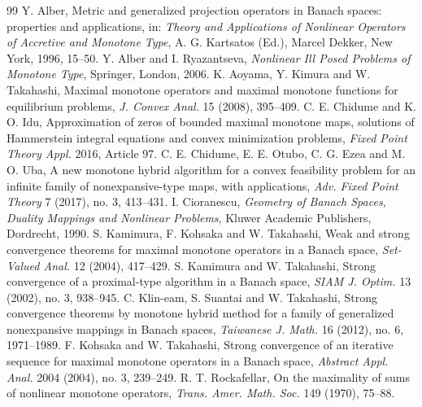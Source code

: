 \documentclass[10pt,a4paper]{amsart}
\numberwithin{equation}{section}
\begin{document}
\begin{thebibliography}{99}
 Y. Alber, Metric and generalized projection operators in Banach spaces: properties and applications, in: \emph{Theory and Applications of Nonlinear Operators of Accretive and Monotone Type}, A. G. Kartsatos (Ed.), Marcel Dekker, New York, 1996, 15--50.
 Y. Alber and I. Ryazantseva, \emph{Nonlinear Ill Posed Problems of Monotone Type}, Springer, London, 2006.
 K. Aoyama, Y. Kimura and W. Takahashi, Maximal monotone operators and maximal monotone functions for equilibrium problems, \emph{J. Convex Anal.} 15 (2008), 395--409.
 C. E. Chidume and K. O. Idu, Approximation of zeros of bounded maximal monotone maps, solutions of Hammerstein integral equations and convex minimization problems, \emph{Fixed Point Theory Appl.} 2016, Article 97.
 C. E. Chidume, E. E. Otubo, C. G. Ezea and M. O. Uba, A new monotone hybrid algorithm for a convex feasibility problem for an infinite family of nonexpansive-type maps, with applications, \emph{Adv. Fixed Point Theory} 7 (2017), no. 3, 413--431.
 I. Cioranescu, \emph{Geometry of Banach Spaces, Duality Mappings and Nonlinear Problems}, Kluwer Academic Publishers, Dordrecht, 1990.
 S. Kamimura, F. Kohsaka and W. Takahashi, Weak and strong convergence theorems for maximal monotone operators in a Banach space, \emph{Set-Valued Anal.} 12 (2004), 417--429.
 S. Kamimura and W. Takahashi, Strong convergence of a proximal-type algorithm in a Banach space, \emph{SIAM J. Optim.} 13 (2002), no. 3, 938--945.
 C. Klin-eam, S. Suantai and W. Takahashi, Strong convergence theorems by monotone hybrid method for a family of generalized nonexpansive mappings in Banach spaces, \emph{Taiwanese J. Math.} 16 (2012), no. 6, 1971--1989.
 F. Kohsaka and W. Takahashi, Strong convergence of an iterative sequence for maximal monotone operators in a Banach space, \emph{Abstract Appl. Anal.} 2004 (2004), no. 3, 239--249.
 R. T. Rockafellar, On the maximality of sums of nonlinear monotone operators, \emph{Trans. Amer. Math. Soc.} 149 (1970), 75--88.

\end{thebibliography}
\end{document}
